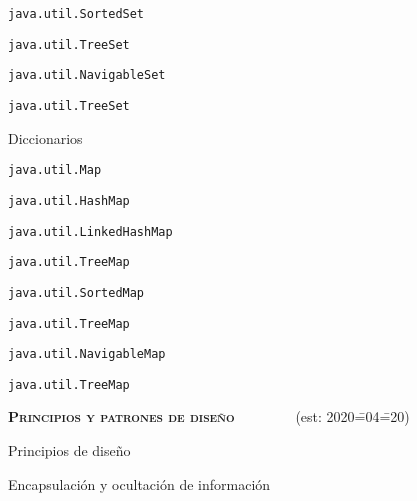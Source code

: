 \begin{longenum}
\begin{longenum}
\begin{longenum}
\begin{longenum}
            \end{longenum}
            \item \texttt{java.util.SortedSet}
            \begin{longenum}
                \item \texttt{java.util.TreeSet}
            \end{longenum}
            \item \texttt{java.util.NavigableSet}
            \begin{longenum}
                \item \texttt{java.util.TreeSet}
            \end{longenum}
        \end{longenum}
        \item Diccionarios
        \begin{longenum}
            \item \texttt{java.util.Map}
            \begin{longenum}
                \item \texttt{java.util.HashMap}
                \item \texttt{java.util.LinkedHashMap}
                \item \texttt{java.util.TreeMap}
            \end{longenum}
            \item \texttt{java.util.SortedMap}
            \begin{longenum}
                \item \texttt{java.util.TreeMap}
            \end{longenum}
            \item \texttt{java.util.NavigableMap}
            \begin{longenum}
                \item \texttt{java.util.TreeMap}
            \end{longenum}
        \end{longenum}
    \end{longenum}
    \item \textbf{\textsc{Principios y patrones de diseño}} \ \ \ \ \ \ \ \ (est: 2020\==04\==20)
    \begin{longenum}
        \item Principios de diseño
        \begin{longenum}
            \item Encapsulación y ocultación de información

\end{longenum}
\end{longenum}
\end{longenum}
